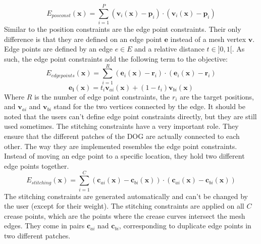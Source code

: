 \documentclass[a4paper,twoside,12pt,nochapterprefix]{scrbook}
\begin{document}
\begin{equation}
E_{posconst}(\mathbf{x}) = \sum_{i = 1}^P (\mathbf{v}_i(\mathbf{x}) - \mathbf{p}_i) \cdot (\mathbf{v}_i(\mathbf{x}) - \mathbf{p}_i)
\end{equation}
Similar to the position constraints are the edge point constraints. Their only difference is that they are defined on an edge point $\mathbf{e}$ instead of a mesh vertex $\mathbf{v}$. Edge points are defined by an edge $e \in E$ and a relative distance $t \in ]0,1[$. As such, the edge point constraints add the following term to the objective:
\begin{equation}
E_{edgepoints}(\mathbf{x}) = \sum_{i = 1}^R (\mathbf{e}_i(\mathbf{x}) - \mathbf{r}_i) \cdot (\mathbf{e}_i(\mathbf{x}) - \mathbf{r}_i)
\end{equation}
\begin{equation}
\mathbf{e_i}(\mathbf{x}) = t_i \mathbf{v}_{ai}(\mathbf{x}) + (1-t_i) \mathbf{v}_{bi}(\mathbf{x})
\end{equation}
Where $R$ is the number of edge point constraints, the $r_i$ are the target positions, and $\mathbf{v}_{ai}$ and $\mathbf{v}_{bi}$ stand for the two vertices connected by the edge. It should be noted that the users can't define edge point constraints directly, but they are still used sometimes.\newline
The stitching constraints have a very important role. They ensure that the different patches of the DOG are actually connected to each other. The way they are implemented resembles the edge point constraints. Instead of moving an edge point to a specific location, they hold two different edge points together.
\begin{equation}
E_{stitching}(\mathbf{x}) = \sum_{i = 1}^C (\mathbf{c}_{ai}(\mathbf{x}) - \mathbf{c}_{bi}(\mathbf{x})) \cdot (\mathbf{c}_{ai}(\mathbf{x}) - \mathbf{c}_{bi}(\mathbf{x}))
\end{equation}
The stitching constraints are generated automatically and can't be changed by the user (except for their weight). The stitching constraints are applied on all $C$ crease points, which are the points where the crease curves intersect the mesh edges. They come in pairs $\mathbf{c}_{ai}$ nad $\mathbf{c}_{bi}$, corresponding to duplicate edge points in two different patches.\newline
\end{document}
